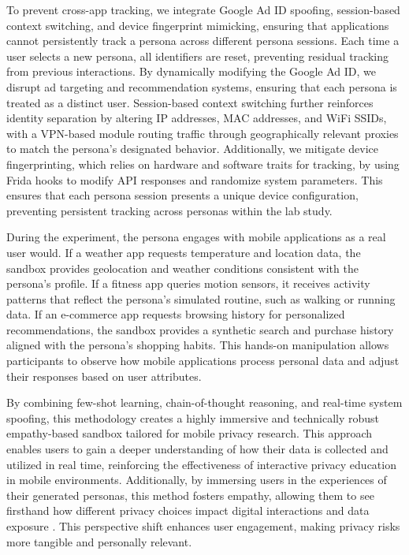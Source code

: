 \documentclass[acmlarge, nonacm]{acmart}
\begin{document}
To prevent cross-app tracking, we integrate Google Ad ID spoofing, session-based context switching, and device fingerprint mimicking, ensuring that applications cannot persistently track a persona across different persona sessions. Each time a user selects a new persona, all identifiers are reset, preventing residual tracking from previous interactions. By dynamically modifying the Google Ad ID, we disrupt ad targeting and recommendation systems, ensuring that each persona is treated as a distinct user. Session-based context switching further reinforces identity separation by altering IP addresses, MAC addresses, and WiFi SSIDs, with a VPN-based module routing traffic through geographically relevant proxies to match the persona’s designated behavior. Additionally, we mitigate device fingerprinting, which relies on hardware and software traits for tracking, by using Frida hooks to modify API responses and randomize system parameters. This ensures that each persona session presents a unique device configuration, preventing persistent tracking across personas within the lab study.

During the experiment, the persona engages with mobile applications as a real user would. If a weather app requests temperature and location data, the sandbox provides geolocation and weather conditions consistent with the persona’s profile. If a fitness app queries motion sensors, it receives activity patterns that reflect the persona’s simulated routine, such as walking or running data. If an e-commerce app requests browsing history for personalized recommendations, the sandbox provides a synthetic search and purchase history aligned with the persona’s shopping habits. This hands-on manipulation allows participants to observe how mobile applications process personal data and adjust their responses based on user attributes.

By combining few-shot learning, chain-of-thought reasoning, and real-time system spoofing, this methodology creates a highly immersive and technically robust empathy-based sandbox tailored for mobile privacy research. This approach enables users to gain a deeper understanding of how their data is collected and utilized in real time, reinforcing the effectiveness of interactive privacy education in mobile environments. Additionally, by immersing users in the experiences of their generated personas, this method fosters empathy, allowing them to see firsthand how different privacy choices impact digital interactions and data exposure \cite{Chaoran2023EmpathySandbox}. This perspective shift enhances user engagement, making privacy risks more tangible and personally relevant.
\end{document}
